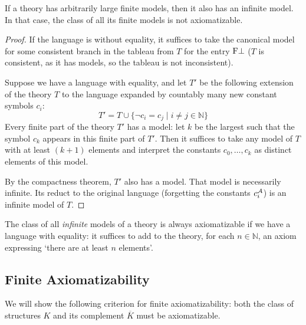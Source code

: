 \begin{theorem}
    If a theory has arbitrarily large finite models, then it also has an infinite model. In that case, the class of all its finite models is not axiomatizable.
\end{theorem}
\begin{proof}
    If the language is without equality, it suffices to take the canonical model for some consistent branch in the tableau from $T$ for the entry $\mathrm{F}\bot$ ($T$ is consistent, as it has models, so the tableau is not inconsistent).     
    
    Suppose we have a language with equality, and let $T'$ be the following extension of the theory $T$ to the language expanded by countably many new constant symbols $c_i$:
    $$
    T'=T \cup \{\neg c_i = c_j \mid i \neq j \in \mathbb{N}\}
    $$
    Every finite part of the theory $T'$ has a model: let $k$ be the largest such that the symbol $c_k$ appears in this finite part of $T'$. Then it suffices to take any model of $T$ with at least $(k+1)$ elements and interpret the constants $c_0, \dots, c_k$ as distinct elements of this model.

    By the compactness theorem, $T'$ also has a model. That model is necessarily infinite. Its reduct to the original language (forgetting the constants $c_i^{\mathcal{A}}$) is an infinite model of $T$.
\end{proof}

\begin{remark}
    The class of all \emph{infinite} models of a theory is always axiomatizable if we have a language with equality: it suffices to add to the theory, for each $n \in \mathbb{N}$, an axiom expressing `there are at least $n$ elements'.
\end{remark}

\subsection{Finite Axiomatizability}

We will show the following criterion for finite axiomatizability: both the class of structures $K$ and its complement $\overline{K}$ must be axiomatizable.

